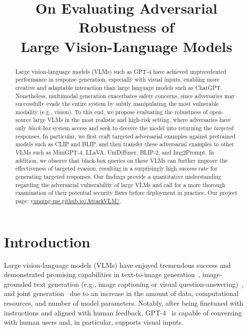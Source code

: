 \title{On Evaluating Adversarial Robustness of\\Large Vision-Language Models}



\maketitle

\begin{abstract}
Large vision-language models (VLMs) such as GPT-4 have achieved unprecedented performance in response generation, especially with visual inputs, enabling more creative and adaptable interaction than large language models such as ChatGPT. Nonetheless, multimodal generation exacerbates safety concerns, since adversaries may successfully evade the entire system by subtly manipulating the most vulnerable modality (e.g., vision). To this end, we propose evaluating the robustness of open-source large VLMs in the most realistic and high-risk setting, where adversaries have only \emph{black-box} system access and seek to deceive the model into returning the \emph{targeted} responses. In particular, we first craft targeted adversarial examples against pretrained models such as CLIP and BLIP, and then transfer these adversarial examples to other VLMs such as MiniGPT-4, LLaVA, UniDiffuser, BLIP-2, and Img2Prompt. In addition, we observe that black-box queries on these VLMs can further improve the effectiveness of targeted evasion, resulting in a surprisingly high success rate for generating targeted responses. Our findings provide a quantitative understanding regarding the adversarial vulnerability of large VLMs and call for a more thorough examination of their potential security flaws before deployment in practice.
Our project page: {\color{RubineRed} \href{https://yunqing-me.github.io/AttackVLM/}{yunqing-me.github.io/AttackVLM/}}.
\end{abstract}

\section{Introduction}
Large vision-language models (VLMs) have enjoyed tremendous success and demonstrated promising capabilities in text-to-image generation~\citep{nichol2021glide,ramesh2022hierarchical,rombach2022high}, image-grounded text generation (e.g., image captioning or visual question-answering)~\citep{alayrac2022flamingo,chen2022visualgpt,li2023blip,tsimpoukelli2021multimodal}, and joint generation~\citep{bao2022one,hu2022unified,xu2022versatile} due to an increase in the amount of data, computational resources, and number of model parameters. Notably, after being finetuned with instructions and aligned with human feedback, GPT-4~\citep{gpt4} is capable of conversing with human users and, in particular, supports visual inputs.


